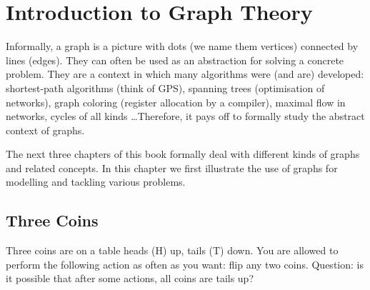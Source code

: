 \chapter{Introduction to Graph Theory}

\vspace{0.5em}
Informally, a graph is a picture with dots (we name them vertices)
connected by lines (edges).
They can often be used as an abstraction for solving a concrete
problem. They are a context in which many algorithms were (and are)
developed: shortest-path algorithms (think of GPS), spanning trees
(optimisation of networks), graph coloring (register allocation by
a compiler), maximal flow in networks, cycles of all kinds
\ldots Therefore, it pays off to formally study the abstract context of
graphs.

The next three chapters of this book formally deal with different kinds
of graphs and related concepts. In this chapter we first illustrate
the use of graphs for modelling and tackling various problems.



\section{Three Coins}

Three coins are on a table heads (H) up, tails (T) down. You are
allowed to perform the following action as often as you want: flip any
two coins. Question: is it possible that after some actions, all
coins are tails up?


